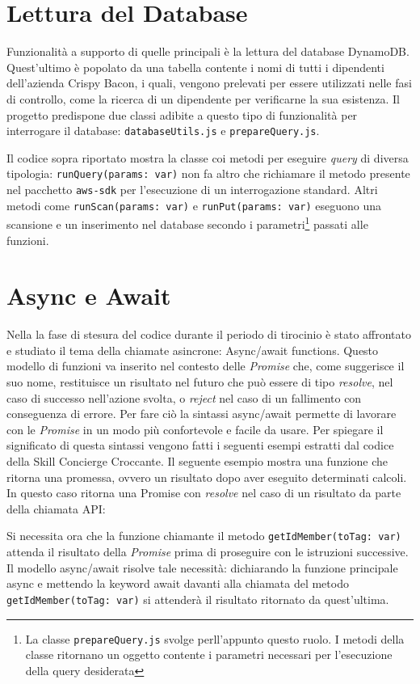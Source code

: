 \newpage
\section{Lettura del Database}
Funzionalità a supporto di quelle principali è la lettura del database DynamoDB. Quest'ultimo è popolato da una tabella contente i nomi di tutti i dipendenti dell'azienda Crispy Bacon, i quali, vengono prelevati per essere utilizzati nelle fasi di controllo, come la ricerca di un dipendente per verificarne la sua esistenza. Il progetto predispone due classi adibite a questo tipo di funzionalità per interrogare il database: \texttt{databaseUtils.js} e \texttt{prepareQuery.js}.


Il codice sopra riportato mostra la classe coi metodi per eseguire \textit{query} di diversa tipologia: \texttt{runQuery(params:  var)} non fa altro che richiamare il metodo presente nel pacchetto \texttt{aws-sdk} per l'esecuzione di un interrogazione standard. Altri metodi come \texttt{runScan(params:  var)} e \texttt{runPut(params:  var)} eseguono una scansione e un inserimento nel database secondo i parametri\footnote{La classe \texttt{prepareQuery.js} svolge perll'appunto questo ruolo. I metodi della classe ritornano un oggetto contente i parametri necessari per l'esecuzione della query desiderata} passati alle funzioni.

\newpage
\section{Async e Await}
Nella la fase di stesura del codice durante il periodo di tirocinio è stato affrontato e studiato il tema della chiamate asincrone: Async/await functions. Questo modello di funzioni va inserito nel contesto delle \textit{Promise} che, come suggerisce il suo nome, restituisce un risultato nel futuro che può essere di tipo \textit{resolve}, nel caso di successo nell'azione svolta, o \textit{reject} nel caso di un fallimento con conseguenza di errore. Per fare ciò la sintassi async/await permette di lavorare con le \textit{Promise} in un modo più confortevole e facile da usare. Per spiegare il significato di questa sintassi vengono fatti i seguenti esempi estratti dal codice della Skill Concierge Croccante. Il seguente esempio mostra una funzione che ritorna una promessa, ovvero un risultato dopo aver eseguito determinati calcoli. In questo caso ritorna una Promise con \textit{resolve} nel caso di un risultato da parte della chiamata API:

\noindent Si necessita ora che la funzione chiamante il metodo \texttt{getIdMember(toTag: var)} attenda il risultato della \textit{Promise} prima di proseguire con le istruzioni successive. Il modello async/await risolve tale necessità: dichiarando la funzione principale async e mettendo la keyword await davanti alla chiamata del metodo \texttt{getIdMember(toTag: var)} si attenderà il risultato ritornato da quest'ultima.


